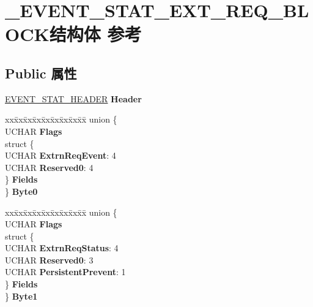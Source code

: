 \hypertarget{struct___e_v_e_n_t___s_t_a_t___e_x_t___r_e_q___b_l_o_c_k}{}\section{\+\_\+\+E\+V\+E\+N\+T\+\_\+\+S\+T\+A\+T\+\_\+\+E\+X\+T\+\_\+\+R\+E\+Q\+\_\+\+B\+L\+O\+C\+K结构体 参考}
\label{struct___e_v_e_n_t___s_t_a_t___e_x_t___r_e_q___b_l_o_c_k}
\subsection*{Public 属性}
\begin{DoxyCompactItemize}
\item 
\mbox{\label{struct___e_v_e_n_t___s_t_a_t___e_x_t___r_e_q___b_l_o_c_k_a67484c793a16cd9764f562d803e60cd4}} 
\hyperlink{struct___e_v_e_n_t___s_t_a_t___h_e_a_d_e_r}{E\+V\+E\+N\+T\+\_\+\+S\+T\+A\+T\+\_\+\+H\+E\+A\+D\+ER} {\bfseries Header}
\item 
\mbox{\label{struct___e_v_e_n_t___s_t_a_t___e_x_t___r_e_q___b_l_o_c_k_ae7c68e925a48647d31a42ca8ab7f829f}} 
\begin{tabbing}
xx\=xx\=xx\=xx\=xx\=xx\=xx\=xx\=xx\=\kill
union \{\\
\>UCHAR {\bfseries Flags}\\
\>struct \{\\
\>\>UCHAR {\bfseries ExtrnReqEvent}: 4\\
\>\>UCHAR {\bfseries Reserved0}: 4\\
\>\} {\bfseries Fields}\\
\} {\bfseries Byte0}\\

\end{tabbing}\item 
\mbox{\label{struct___e_v_e_n_t___s_t_a_t___e_x_t___r_e_q___b_l_o_c_k_a4a2c98102233b812358b7a968013d19b}} 
\begin{tabbing}
xx\=xx\=xx\=xx\=xx\=xx\=xx\=xx\=xx\=\kill
union \{\\
\>UCHAR {\bfseries Flags}\\
\>struct \{\\
\>\>UCHAR {\bfseries ExtrnReqStatus}: 4\\
\>\>UCHAR {\bfseries Reserved0}: 3\\
\>\>UCHAR {\bfseries PersistentPrevent}: 1\\
\>\} {\bfseries Fields}\\
\} {\bfseries Byte1}\\


\end{tabbing}
\end{DoxyCompactItemize}
